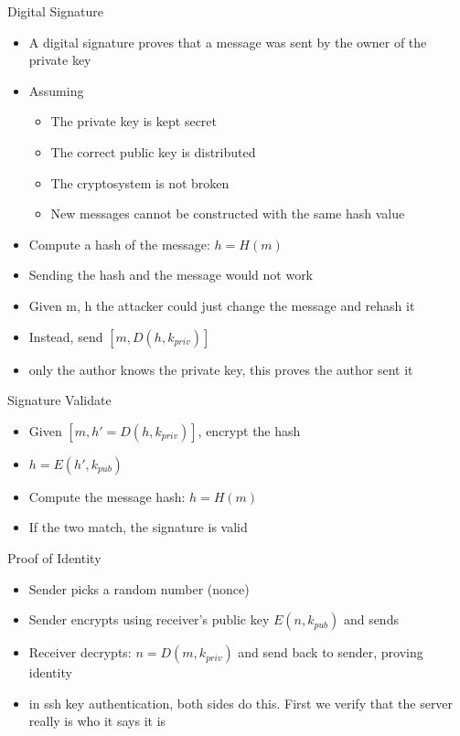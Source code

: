 \begin{frame}{Digital Signature}
    \begin{itemize}
        \item A digital signature proves that a message was sent by the owner of the private key
        \item Assuming
        \begin{itemize}
            \item The private key is kept secret
            \item The correct public key is distributed
            \item The cryptosystem is not broken
            \item New messages cannot be constructed with the same hash value
        \end{itemize}
        \item Compute a hash of the message: $h=H(m)$
        \item Sending the hash and the message would not work
        \item Given m, h the attacker could just change the message and rehash it
        \item Instead, send $[m, D(h, k_{priv})]$
        \item only the author knows the private key, this proves the author sent it
    \end{itemize}
\end{frame}

\begin{frame}{Signature Validate}
    \begin{itemize}
        \item Given $[m, h' = D(h, k_{priv})]$, encrypt the hash
        \item $h = E(h', k_{pub})$
        \item Compute the message hash: $h = H(m)$
        \item If the two match, the signature is valid
    \end{itemize}
\end{frame}

\begin{frame}{Proof of Identity}
    \begin{itemize}
        \item Sender picks a random number (nonce)
        \item Sender encrypts using receiver's public key $E(n, k_{pub})$ and sends
        \item Receiver decrypts: $n = D(m, k_{priv})$ and send back to sender, proving identity
        \item in ssh key authentication, both sides do this. First we verify that the server really is who it says it is
    \end{itemize}
\end{frame}

